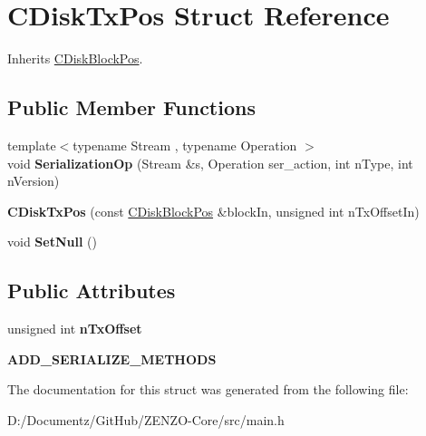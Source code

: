 \hypertarget{struct_c_disk_tx_pos}{}\section{C\+Disk\+Tx\+Pos Struct Reference}
\label{struct_c_disk_tx_pos}


Inherits \mbox{\hyperlink{struct_c_disk_block_pos}{C\+Disk\+Block\+Pos}}.

\subsection*{Public Member Functions}
\begin{DoxyCompactItemize}
\item 
\mbox{\label{struct_c_disk_tx_pos_a1a68f1de894f0791a7ad64e3e6ea6fd6}} 
{\footnotesize template$<$typename Stream , typename Operation $>$ }\\void {\bfseries Serialization\+Op} (Stream \&s, Operation ser\+\_\+action, int n\+Type, int n\+Version)
\item 
\mbox{\label{struct_c_disk_tx_pos_ab823a4c83ec90c8223544051f11e65fd}} 
{\bfseries C\+Disk\+Tx\+Pos} (const \mbox{\hyperlink{struct_c_disk_block_pos}{C\+Disk\+Block\+Pos}} \&block\+In, unsigned int n\+Tx\+Offset\+In)
\item 
\mbox{\label{struct_c_disk_tx_pos_a22eb47d077f9c355373772eb42853fcf}} 
void {\bfseries Set\+Null} ()
\end{DoxyCompactItemize}
\subsection*{Public Attributes}
\begin{DoxyCompactItemize}
\item 
\mbox{\label{struct_c_disk_tx_pos_af19fa085a69ba3bac7b52413a37adf23}} 
unsigned int {\bfseries n\+Tx\+Offset}
\item 
\mbox{\label{struct_c_disk_tx_pos_a2990c083fbbd0fb5f5aa4115e540cd21}} 
{\bfseries A\+D\+D\+\_\+\+S\+E\+R\+I\+A\+L\+I\+Z\+E\+\_\+\+M\+E\+T\+H\+O\+DS}
\end{DoxyCompactItemize}


The documentation for this struct was generated from the following file\+:\begin{DoxyCompactItemize}
\item 
D\+:/\+Documentz/\+Git\+Hub/\+Z\+E\+N\+Z\+O-\/\+Core/src/main.\+h\end{DoxyCompactItemize}
